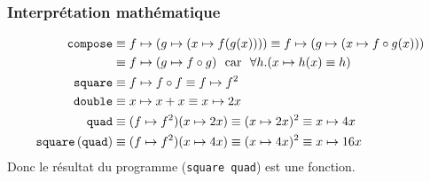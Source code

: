 %
\begin{frame}[containsverbatim]
\frametitle{Interprétation mathématique}
\label{maths}

{\small
\begin{alignat*}{1}
  \texttt{compose} &\equiv f \mapsto (g \mapsto (x \mapsto f(g(x))))
  \equiv f \mapsto (g \mapsto (x \mapsto f \circ g (x)))\\ 
&\equiv f \mapsto (g \mapsto f \circ g) \ \ \textnormal{car} \ \
  \forall h.(x \mapsto h(x) \equiv h)\\
  \texttt{square} &\equiv f \mapsto f \circ f \equiv f \mapsto f^2\\
  \texttt{double} &\equiv x \mapsto x + x \equiv x \mapsto 2x\\
  \texttt{quad}   &\equiv (f \mapsto f^2)(x \mapsto 2x) \equiv (x
  \mapsto 2x)^2 \equiv x \mapsto 4x\\
  \texttt{square} \, (\texttt{quad}) &\equiv (f \mapsto f^2)(x \mapsto
  4x) \equiv (x \mapsto 4x)^2 \equiv x \mapsto 16x
  \end{alignat*}
}
Donc le résultat du programme (\verb+square quad+) est une fonction.

\end{frame}

